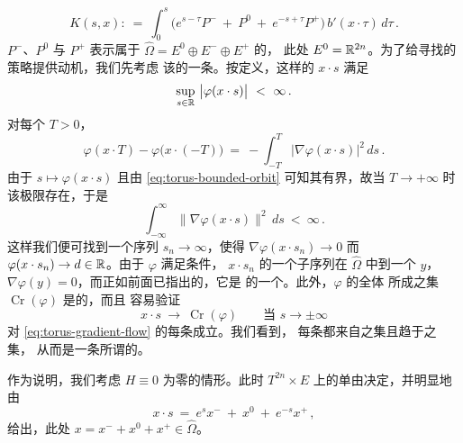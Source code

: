 \begin{equation}\label{eq:torus-variation-constants}
K(s,x):\ =\ \int_{0}^{s}\bigl(e^{s-\tau}P^{-}\ +\ P^{0}\ +\ e^{-s+\tau}P^{+}\bigr)\,%
b'(x\cdot\tau)\,d\tau\,.
\end{equation}
\trLinearOperator{} $P^{-}$、$P^{0}$ 与 $P^{+}$ 表示属于\trSplitting%
$\widehat{\Omega}=E^{0}\oplus E^{-}\oplus E^{+}$ 的\trOrthogonal\trProjection，%
此处 $E^{0}=\mathbb{R}^{2n}$。为了给寻找\trCriticalPoint{}的策略提供动机，我们先考虑%
该\trFlow{}的一条\trBounded\trOrbit。按定义，这样的\trOrbit{} $x\cdot s$ 满足
\begin{equation}\label{eq:torus-bounded-orbit}
\sup_{s\in\mathbb{R}}\ \bigl|\varphi(x\cdot s)\bigr|\ <\ \infty\,.
\end{equation}
对每个 $T>0$，
\begin{equation}\label{eq:torus-monotone-decrease}
\varphi(x\cdot T)-\varphi\bigl(x\cdot(-T)\bigr)\ =\ -\int_{-T}^{T}\bigl|\nabla%
\varphi(x\cdot s)\bigr|^{2}\,ds\,.
\end{equation}
由于 $s\mapsto\varphi(x\cdot s)$ \trMonotone{}且由 \eqref{eq:torus-bounded-orbit}%
可知其有界，故当 $T\to+\infty$ 时该极限存在，于是
\begin{equation}\label{eq:torus-l2-integrable}
\int_{-\infty}^{\infty}\bigl\|\nabla\varphi(x\cdot s)\bigr\|^{2}\,ds\ <\ \infty\,.
\end{equation}
这样我们便可找到一个序列 $s_{n}\to\infty$，使得 $\nabla\varphi(x\cdot s_{n})\to0$%
而 $\varphi(x\cdot s_{n})\to d\in\mathbb{R}$。由于 $\varphi$ 满足\trPalaisSmale{}条件，%
$x\cdot s_{n}$ 的一个子序列在 $\widehat{\Omega}$ 中\trConverge{}到一个%
\trCriticalPoint{} $y$，$\nabla\varphi(y)=0$，而正如前面已指出的，它是%
\trHamiltonianEquation{}的一个\trPeriodicSolution。此外，$\varphi$ 的全体%
\trCriticalPoint{}所成之集 $\operatorname{Cr}(\varphi)$ 是\trCompact{}的，而且%
容易验证
\begin{equation}\label{eq:torus-limit-critical}
x\cdot s\ \longrightarrow\ \operatorname{Cr}(\varphi)\qquad\text{当 }s\to\pm\infty
\end{equation}
对 \eqref{eq:torus-gradient-flow} 的每条\trBounded\trOrbit{}成立。我们看到，%
每条\trBounded\trOrbit{}都来自\trCriticalPoint{}之集且趋于\trCriticalPoint{}之集，%
从而是一条所谓的\trConnectingOrbit。

作为说明，我们考虑\trHamiltonianFunction{} $H\equiv0$ 为零的情形。此时%
$T^{2n}\times E$ 上的\trFlow{}单由\trSymplecticStructure{}决定，并明显地由
\[
x\cdot s\ =\ e^{s}x^{-}\ +\ x^{0}\ +\ e^{-s}x^{+}\,,
\]
给出，此处 $x=x^{-}+x^{0}+x^{+}\in\widehat{\Omega}$。

